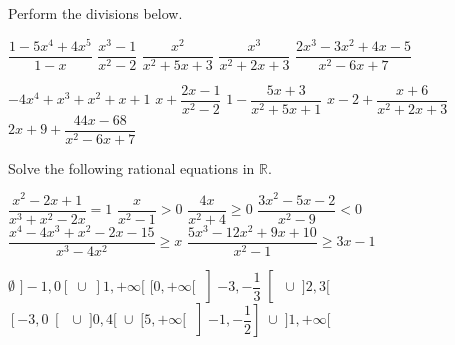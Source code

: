 \begin{Exercise} Perform the divisions below.  
 	\begin{multicols}{2}
     	\Question[difficulty = 1] $\dfrac{1-5x^4+4x^5}{1-x}$
     	\Question[difficulty = 1] $\dfrac{x^3-1}{x^2-2}$ 
     	\Question[difficulty = 1] $\dfrac{x^2}{x^2+5x+3}$ 
     	\Question[difficulty = 1] $\dfrac{x^3}{x^2+2x+3}$ 
     	\Question[difficulty = 1] $\dfrac{2x^3 -3x^2+4x-5}{x^2-6x+7}$
     	\EndCurrentQuestion
 	\end{multicols}

\end{Exercise}

\begin{Answer}\phantom{}
    \begin{multicols}{2}
    
    	\Question $-4x^4+x^3+x^2+x+1$
    	\Question $x + \dfrac{2x-1}{x^2-2}$
    	\Question $1 - \dfrac{5x+3}{x^2+5x+1}$
    	\Question $x-2 + \dfrac{x+6}{x^2+2x+3}$
    	\Question $2x+9 + \dfrac{44x-68}{x^2-6x+7}$
    \EndCurrentQuestion
    \end{multicols}
\end{Answer}
 
\begin{Exercise} Solve the following rational equations in $\mathbb{R}$. 
	\begin{multicols}{2}
    	\Question[difficulty = 1] $\dfrac{x^2-2x+1}{x^3+x^2-2x} = 1$
    	\Question[difficulty = 1] $\dfrac{x}{x^2 - 1} > 0$
    	\Question[difficulty = 1] $\dfrac{4x}{x^2 + 4} \geq 0$
    	\ifanalysis\Question[difficulty = 1]\fi\ifcalculus\Question[difficulty = 2]\fi  $\dfrac{3x^2-5x-2}{x^2-9} < 0$
    	\Question[difficulty = 2] $\dfrac{x^4-4x^{3} + x^2-2x-15}{x^3 -4x^2} \geq x$
    	\Question[difficulty = 2] $\dfrac{5x^{3} - 12x^2+9x+10}{x^2-1} \geq 3x-1$
    	\EndCurrentQuestion
	\end{multicols}

\end{Exercise}

\begin{Answer}\phantom{}
    \begin{multicols}{2}
	
	\Question $\emptyset$  
	\Question $]-1,0[\; \cup \;]1, + \infty[$ 
	\Question $[0, +\infty[$
	\Question $\left]-3, -\dfrac{1}{3}\right[\; \cup \; ]2,3[$ 
	\Question $\left[-3, 0\right[ \;\cup \; ]0,4[ \; \cup \; [5, +\infty[ $ 
	\Question $\left]-1, -\dfrac{1}{2}\right]\; \cup \; ]1,+\infty[$  
	\EndCurrentQuestion
	\end{multicols}
\end{Answer}


